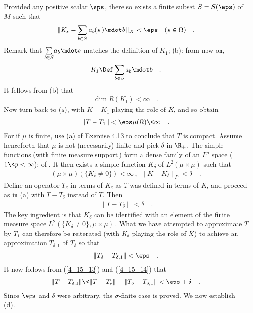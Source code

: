 Provided any positive scalar $\eps$, there so exists a finite subset $S=S(\eps)$ of $M$ such that
\begin{align}
\| K_s - \sum_{b\in S} a_b(s\,) \mdot b\,\|_X < \eps \quad  (s\in \Omega)\quad .
\end{align}
Remark that $\underset{b\in S}{\sum} a_b \mdot b$ matches the definition of $K_1$; \cf(b): from now on, 
\begin{align}
K_1\Def \sum_{b\in S} a_b \mdot b\quad .
\end{align}
It follows from (b) that
\begin{align}
\dim R(K_1) < \infty \quad.
\end{align}
Now turn back to (a), with $K-K_1$ playing the role of $K$, and so obtain
\begin{align}
\|T-T_1\| < \eps \mu(\Omega)\< \infty \quad .
\end{align}
For if $\mu$ is finite, use (a) of Exercise 4.13 to conclude that $T$ is compact. Assume henceforth that $\mu$ is not (necessarily) finite and pick $\delta$ in $\R_+$. The simple functions (with finite measure support\,) form a dense family of an $L^p$ space ($1\< p<\infty$);  of \cite{Big_Rudin}. It then exists a simple function $K_\delta$ of $L^2(\mu\times \mu)$ such that 
\begin{align}
(\mu\times\mu)\left(\{K_\delta\neq 0\}\right) <\infty \,, \,\, \| K-K_\delta \|_P <\delta\quad .
\end{align}
Define an operator $T_\delta$ in terms of $K_\delta$ as $T$ was defined in terms of $K$, and proceed as in (a) with $T-T_\delta$ instead of $T$. Then
\begin{align}\label{4_15_13}
\|T-T_\delta\| < \delta\quad .
\end{align}
The key ingredient is that $K_\delta$ can be identified with an element of the finite measure space $L^2(\{K_\delta\neq 0\},\mu\times\mu)\,$. What we have attempted to approximate $T$ by $T_1$ can therefore be reiterated (with $K_\delta$ playing the role of $K$) to achieve an approximation $T_{\delta,1}$ of $T_\delta$ so that
\begin{align}\label{4_15_14}
\|T_{\delta}-T_{\delta,1}\| < \eps\quad .
\end{align}
It now follows from (\ref{4_15_13}) and (\ref{4_15_14}) that
\begin{align}
\|T-T_{\delta,1}\|\< \|T-T_{\delta}\| +\|T_{\delta}-T_{\delta,1}\| < \eps+\delta\quad .
\end{align}
Since $\eps$ and $\delta$ were arbitrary, the $\sigma$-finite case is proved. We now establish (d).\\
